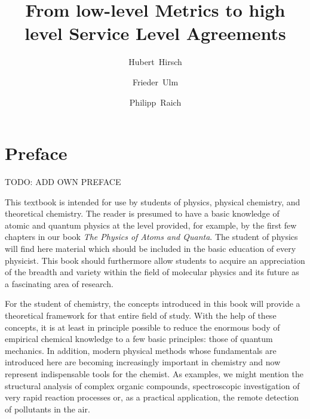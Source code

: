 \documentclass{llncs}
\begin{document}
%
%
\pagestyle{headings}  %
%
\chapter*{Preface}
%
TODO: ADD OWN PREFACE

This textbook is intended for use by students of physics, physical
chemistry, and theoretical chemistry. The reader is presumed to have a
basic knowledge of atomic and quantum physics at the level provided, for
example, by the first few chapters in our book {\it The Physics of Atoms
and Quanta}. The student of physics will find here material which should
be included in the basic education of every physicist. This book should
furthermore allow students to acquire an appreciation of the breadth and
variety within the field of molecular physics and its future as a
fascinating area of research.

For the student of chemistry, the concepts introduced in this book will
provide a theoretical framework for that entire field of study. With the
help of these concepts, it is at least in principle possible to reduce
the enormous body of empirical chemical knowledge to a few basic
principles: those of quantum mechanics. In addition, modern physical
methods whose fundamentals are introduced here are becoming increasingly
important in chemistry and now represent indispensable tools for the
chemist. As examples, we might mention the structural analysis of
complex organic compounds, spectroscopic investigation of very rapid
reaction processes or, as a practical application, the remote detection
of pollutants in the air.

%
\tableofcontents
%
\mainmatter              %
%
\title{From low-level Metrics to high level Service Level Agreements}
%
%
\author{Hubert~Hirsch \and Frieder~Ulm \and
Philipp~Raich}
%
%
%
\end{document}
